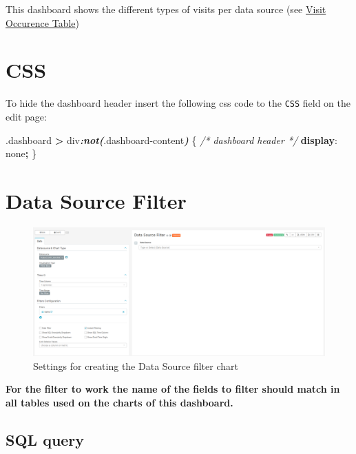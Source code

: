 \documentclass[
]{book}
\newenvironment{Shaded}{\begin{snugshade}}{\end{snugshade}}
\newcommand{\CommentTok}[1]{\textcolor[rgb]{0.56,0.35,0.01}{\textit{#1}}}
\newcommand{\DecValTok}[1]{\textcolor[rgb]{0.00,0.00,0.81}{#1}}
\newcommand{\FunctionTok}[1]{\textcolor[rgb]{0.00,0.00,0.00}{#1}}
\newcommand{\InformationTok}[1]{\textcolor[rgb]{0.56,0.35,0.01}{\textbf{\textit{#1}}}}
\newcommand{\KeywordTok}[1]{\textcolor[rgb]{0.13,0.29,0.53}{\textbf{#1}}}
\newcommand{\NormalTok}[1]{#1}
\newcommand{\OperatorTok}[1]{\textcolor[rgb]{0.81,0.36,0.00}{\textbf{#1}}}
\begin{document}
This dashboard shows the different types of visits per data source (see \href{https://ohdsi.github.io/CommonDataModel/cdm531.html\#visit_occurrence}{Visit Occurence Table})

\hypertarget{css-3}{%
\section{CSS}\label{css-3}}

To hide the dashboard header insert the following css code to the \texttt{CSS} field on the edit page:

\begin{Shaded}
\begin{Highlighting}[]
\FunctionTok{.dashboard} \OperatorTok{\textgreater{}}\NormalTok{ div}\InformationTok{:not(}\FunctionTok{.dashboard{-}content}\InformationTok{)}\NormalTok{ \{  }\CommentTok{/* dashboard header */}
  \KeywordTok{display}\NormalTok{: }\DecValTok{none}\OperatorTok{;}
\NormalTok{\}}
\end{Highlighting}
\end{Shaded}

\hypertarget{data-source-filter-2}{%
\section{Data Source Filter}\label{data-source-filter-2}}

\begin{figure}
\includegraphics[width=1\linewidth]{images/shared/data_source_filter} \caption{Settings for creating the Data Source filter chart}\label{fig:dataSourceFilter}
\end{figure}

\textbf{For the filter to work the name of the fields to filter should match in all tables used on the charts of this dashboard.}

\hypertarget{sql-query-16}{%
\subsection{SQL query}\label{sql-query-16}}
\end{document}
